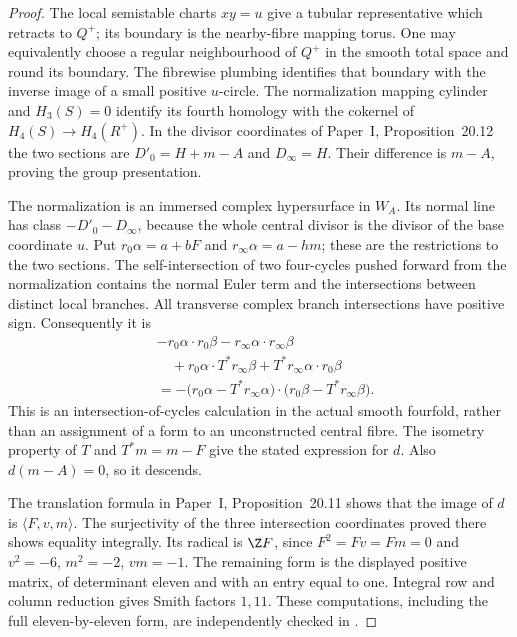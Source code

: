 \begin{proof}
The local semistable charts $xy=u$ give a tubular representative which
retracts to $Q^+$; its boundary is the nearby-fibre mapping torus. One
may equivalently choose a regular neighbourhood of $Q^+$ in the smooth
total space and round its boundary. The fibrewise plumbing identifies
that boundary with the inverse image of a small positive $u$-circle.
The normalization mapping cylinder and $H_3(S)=0$ identify its fourth
homology with the cokernel of
$H_4(S)\to H_4(R^+)$. In the divisor coordinates of Paper~I, Proposition~20.12 the two
sections are $D'_0=H+m-A$ and $D_\infty=H$. Their difference is
$m-A$, proving the group presentation.

The normalization is an immersed complex hypersurface in $W_A$.
Its normal line has class $-D'_0-D_\infty$, because the whole central
divisor is the divisor of the base coordinate $u$. Put
$r_0\alpha=a+bF$ and $r_\infty\alpha=a-hm$; these are the
restrictions to the two sections. The self-intersection of two
four-cycles pushed forward from the normalization contains the normal
Euler term and the intersections between distinct local branches.
All transverse complex branch intersections have positive sign.
Consequently it is
\begin{align*}
 &-r_0\alpha\cdot r_0\beta-r_\infty\alpha\cdot r_\infty\beta\\
 &\quad+r_0\alpha\cdot T^*r_\infty\beta
       +T^*r_\infty\alpha\cdot r_0\beta\\
 &=-\bigl(r_0\alpha-T^*r_\infty\alpha\bigr)
       \cdot\bigl(r_0\beta-T^*r_\infty\beta\bigr).
\end{align*}
This is an intersection-of-cycles calculation in the actual smooth
fourfold, rather than an assignment of a form to an unconstructed
central fibre. The isometry property of $T$ and $T^*m=m-F$ give
the stated expression for $d$. Also $d(m-A)=0$, so it descends.

The translation formula in Paper~I, Proposition~20.11 shows that the image of $d$ is
$\langle F,v,m\rangle$. The surjectivity of the three intersection
coordinates proved there shows equality integrally. Its radical is
$\Z F$, since $F^2=Fv=Fm=0$ and
$v^2=-6$, $m^2=-2$, $vm=-1$. The remaining form is the displayed
positive matrix, of determinant eleven and with an entry equal to
one. Integral row and column reduction gives Smith factors $1,11$.
These computations, including the full eleven-by-eleven form, are
independently checked in .
\end{proof}

